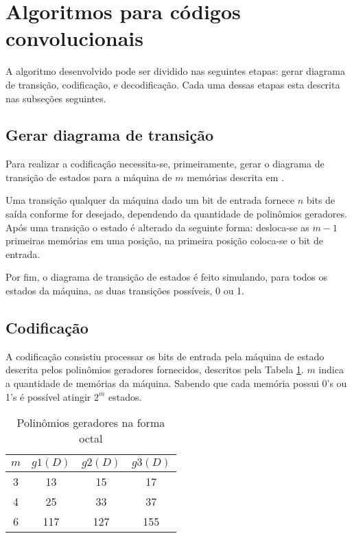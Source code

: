 \section{Algoritmos para códigos convolucionais}
A algoritmo desenvolvido pode ser dividido nas seguintes etapas: gerar diagrama de transição, codificação, e decodificação. Cada uma dessas etapas esta descrita nas subseções seguintes.

\subsection{Gerar diagrama de transição}

Para realizar a codificação necessita-se, primeiramente, gerar o diagrama de transição de estados para a máquina de $m$ memórias descrita em \cite{ref:roteiro_lab3}. 

Uma transição qualquer da máquina dado um bit de entrada fornece $n$ bits de saída conforme for desejado, dependendo da quantidade de polinômios geradores.
Após uma transição o estado é alterado da seguinte forma: desloca-se as $m-1$ primeiras memórias em uma posição, na primeira posição coloca-se o bit de entrada.

Por fim, o diagrama de transição de estados é feito simulando, para todos os estados da máquina, as duas transições possíveis, 0 ou 1.


\subsection{Codificação}

A codificação consistiu processar os bits de entrada pela máquina de estado descrita pelos polinômios geradores fornecidos, descritos pela Tabela \ref{tab:polinomios_geradores}. $m$ indica a quantidade de memórias da máquina. Sabendo que cada memória possui 0's ou 1's é possível atingir $2^{m}$ estados.

\begin{table}[h!]
	\centering
	\caption{Polinômios geradores na forma octal}
	\label{tab:polinomios_geradores}
	\begin{tabular}{|c|c|c|c|}
		\hline
		$m$ & $g1(D)$ & $g2(D)$ & $g3(D)$ \\ \hline\hline
		 3  &   13    &   15    &   17    \\ \hline
		 4  &   25    &   33    &   37    \\ \hline
		 6  &   117   &   127   &   155   \\ \hline
	\end{tabular} 
\end{table}

